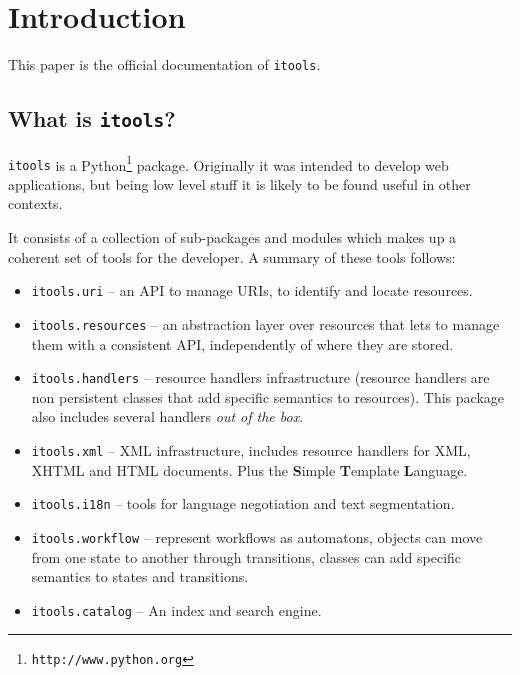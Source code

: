 \chapter{Introduction}

This paper is the official documentation of {\tt itools}.

\section{What is {\tt itools}?}

{\tt itools} is a Python\footnote{\tt http://www.python.org} package.
Originally it was intended to develop web applications, but being low
level stuff it is likely to be found useful in other contexts.

It consists of a collection of sub-packages and modules which makes up a
coherent set of tools for the developer. A summary of these tools follows:

\begin{itemize}
 \item {\tt itools.uri} -- an API to manage URIs, to identify and locate
    resources.

 \item {\tt itools.resources} -- an abstraction layer over resources that
   lets to manage them with a consistent API, independently of where they
   are stored.

 \item {\tt itools.handlers} -- resource handlers infrastructure (resource
   handlers are non persistent classes that add specific semantics to
   resources). This package also includes several handlers {\em out of the
   box}.

 \item {\tt itools.xml} -- XML infrastructure, includes resource handlers
   for XML, XHTML and HTML documents. Plus the {\bf S}imple {\bf T}emplate
   {\bf L}anguage.

 \item {\tt itools.i18n} -- tools for language negotiation and text
   segmentation.

 \item {\tt itools.workflow} -- represent workflows as automatons, objects
   can move from one state to another through transitions, classes can add
   specific semantics to states and transitions.

 \item {\tt itools.catalog} -- An index and search engine.
\end{itemize}



